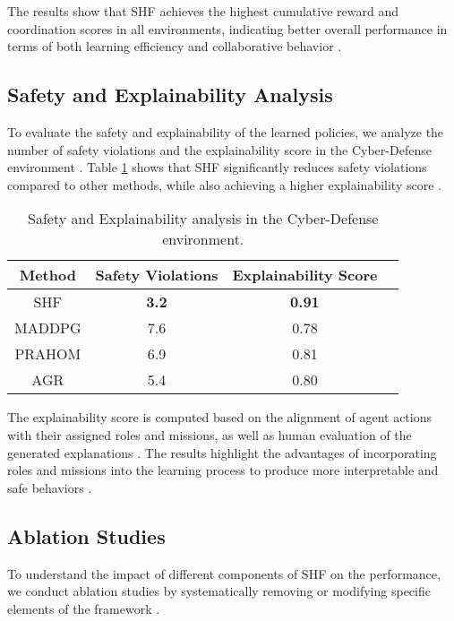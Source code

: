 \documentclass[sigconf,anonymous]{aamas}
\begin{document}
The results show that SHF achieves the highest cumulative reward and coordination scores in all environments, indicating better overall performance in terms of both learning efficiency and collaborative behavior \cite{foerster2018counterfactual, wei2019safe}.

\subsection{Safety and Explainability Analysis}
To evaluate the safety and explainability of the learned policies, we analyze the number of safety violations and the explainability score in the Cyber-Defense environment \cite{ghosal2021explainable}. Table \ref{table:safety_explainability} shows that SHF significantly reduces safety violations compared to other methods, while also achieving a higher explainability score \cite{wei2019safe, su2021toward}.

\begin{table}[ht]
\centering
\caption{Safety and Explainability analysis in the Cyber-Defense environment.}
\label{table:safety_explainability}
\begin{tabular}{|c|c|c|c|}
\hline
\textbf{Method} & \textbf{Safety Violations} & \textbf{Explainability Score} \\ \hline
SHF & \textbf{3.2} & \textbf{0.91} \\ \hline
MADDPG & 7.6 & 0.78 \\ \hline
PRAHOM & 6.9 & 0.81 \\ \hline
AGR & 5.4 & 0.80 \\ \hline
\end{tabular}
\end{table}


The explainability score is computed based on the alignment of agent actions with their assigned roles and missions, as well as human evaluation of the generated explanations \cite{ghosal2021explainable}. The results highlight the advantages of incorporating roles and missions into the learning process to produce more interpretable and safe behaviors \cite{hubner2010moise, soule2024}.

\subsection{Ablation Studies}
To understand the impact of different components of SHF on the performance, we conduct ablation studies by systematically removing or modifying specific elements of the framework \cite{foerster2018counterfactual}.
\end{document}

